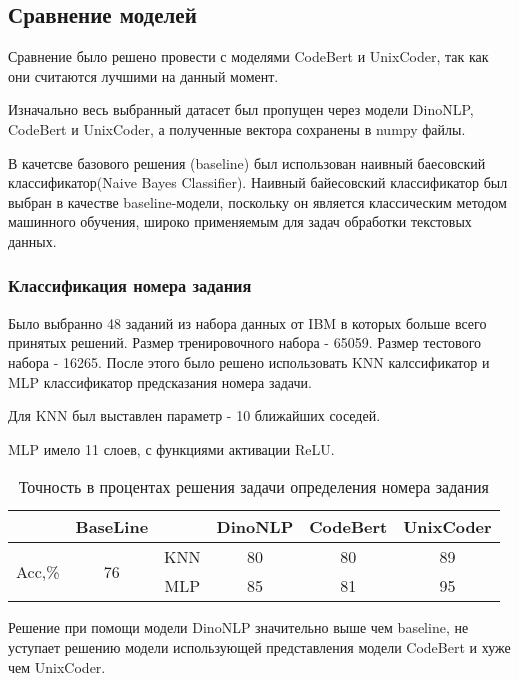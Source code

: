 \documentclass[../part_3.tex]{subfiles}
\begin{document}
\subsection{Сравнение моделей}
\par Сравнение было решено провести с моделями CodeBert и UnixCoder, так как они считаются лучшими на данный момент.
\par Изначально весь выбранный датасет был пропущен через модели DinoNLP, CodeBert и UnixCoder, а полученные вектора сохранены в numpy файлы.
\par В качетсве базового решения (baseline) был использован наивный баесовский классификатор(Naive Bayes Classifier). Наивный байесовский классификатор был выбран в качестве baseline-модели, поскольку он является классическим методом машинного обучения, широко применяемым для задач обработки текстовых данных.  
\subsubsection{Классификация номера задания}
\par Было выбранно 48 заданий из набора данных от IBM в которых больше всего принятых решений. Размер тренировочного набора - 65059. Размер тестового набора - 16265. После этого было решено использовать KNN калссификатор и MLP классификатор предсказания номера задачи.
\par Для KNN был выставлен параметр - 10 ближайших соседей.
\par MLP имело 11 слоев, с функциями активации ReLU.
\begin{table}[H]
    \centering
    \begin{tabular}{|c|c||c|c|c|c|}\hline 
        &BaseLine&&DinoNLP&CodeBert&UnixCoder\\ \hline 
        \multirow{2}{*}{Acc,\%}&\multirow{2}{*}{76}&KNN&80&80&89\\\cline{3-6}
        &&MLP&85&81&95\\\hline
    \end{tabular}  
    \caption{Точность в процентах решения задачи определения номера задания}
\end{table}
\par Решение при помощи модели DinoNLP значительно выше чем baseline, не уступает решению модели использующей представления модели CodeBert и хуже чем UnixCoder.
\end{document}
